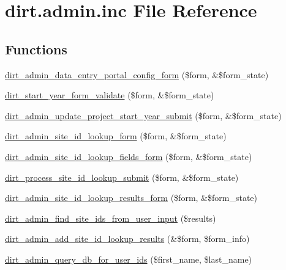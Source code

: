 \hypertarget{dirt_8admin_8inc}{}\section{dirt.\+admin.\+inc File Reference}
\label{dirt_8admin_8inc}
\subsection*{Functions}
\begin{DoxyCompactItemize}
\item 
\mbox{\hyperlink{dirt_8admin_8inc_a610151e37bdc1730034788f9ead5ff12}{dirt\+\_\+admin\+\_\+data\+\_\+entry\+\_\+portal\+\_\+config\+\_\+form}} (\$form, \&\$form\+\_\+state)
\item 
\mbox{\hyperlink{dirt_8admin_8inc_aeae2d67acf1943b411a95f35f9648950}{dirt\+\_\+start\+\_\+year\+\_\+form\+\_\+validate}} (\$form, \&\$form\+\_\+state)
\item 
\mbox{\hyperlink{dirt_8admin_8inc_aaf93658f3f3c7df540b59df37c47725c}{dirt\+\_\+admin\+\_\+update\+\_\+project\+\_\+start\+\_\+year\+\_\+submit}} (\$form, \&\$form\+\_\+state)
\item 
\mbox{\hyperlink{dirt_8admin_8inc_adb0901f2a287132feedb0e534c3796ed}{dirt\+\_\+admin\+\_\+site\+\_\+id\+\_\+lookup\+\_\+form}} (\$form, \&\$form\+\_\+state)
\item 
\mbox{\hyperlink{dirt_8admin_8inc_a9a118204746b1d6df9c336b480bb945a}{dirt\+\_\+admin\+\_\+site\+\_\+id\+\_\+lookup\+\_\+fields\+\_\+form}} (\$form, \&\$form\+\_\+state)
\item 
\mbox{\hyperlink{dirt_8admin_8inc_a5654a1f99eb89b1b9a82fa0b13e1e534}{dirt\+\_\+process\+\_\+site\+\_\+id\+\_\+lookup\+\_\+submit}} (\$form, \&\$form\+\_\+state)
\item 
\mbox{\hyperlink{dirt_8admin_8inc_a2193424437ff65a6cd7244f433a2953e}{dirt\+\_\+admin\+\_\+site\+\_\+id\+\_\+lookup\+\_\+results\+\_\+form}} (\$form, \&\$form\+\_\+state)
\item 
\mbox{\hyperlink{dirt_8admin_8inc_a13dbf8d61d54bd13eacfaffce181fe68}{dirt\+\_\+admin\+\_\+find\+\_\+site\+\_\+ids\+\_\+from\+\_\+user\+\_\+input}} (\$results)
\item 
\mbox{\hyperlink{dirt_8admin_8inc_ae6d4e39cbe2330a90b29903b03da9be4}{dirt\+\_\+admin\+\_\+add\+\_\+site\+\_\+id\+\_\+lookup\+\_\+results}} (\&\$form, \$form\+\_\+info)
\item 
\mbox{\hyperlink{dirt_8admin_8inc_a4414114d7df39a6daaea00db09b6c0ca}{dirt\+\_\+admin\+\_\+query\+\_\+db\+\_\+for\+\_\+user\+\_\+ids}} (\$first\+\_\+name, \$last\+\_\+name)

\end{DoxyCompactItemize}

